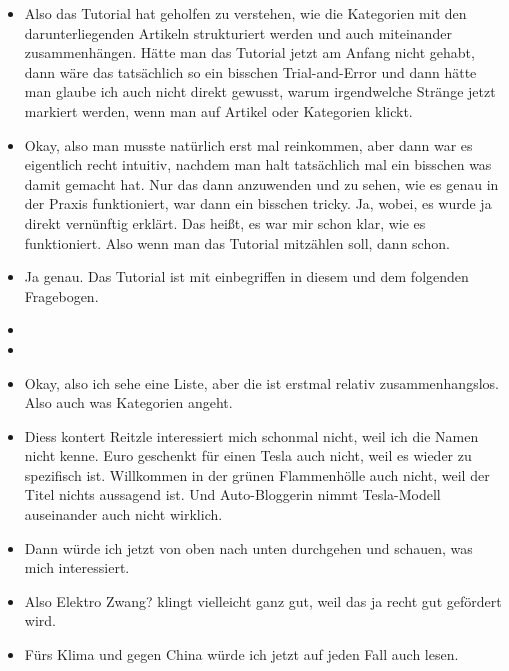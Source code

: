 {\begin{itemize}[]
            \item {} Also das Tutorial hat geholfen zu verstehen, wie die Kategorien mit den darunterliegenden Artikeln strukturiert werden und auch miteinander zusammenhängen.
                  Hätte man das Tutorial jetzt am Anfang nicht gehabt, dann wäre das tatsächlich so ein bisschen Trial-and-Error und dann hätte man glaube ich auch nicht direkt gewusst, warum irgendwelche Stränge jetzt markiert werden, wenn man auf Artikel oder Kategorien klickt.
            \item {} Okay, also man musste natürlich erst mal reinkommen, aber dann war es eigentlich recht intuitiv, nachdem man halt tatsächlich mal ein bisschen was damit gemacht hat.
                  Nur das dann anzuwenden und zu sehen, wie es genau in der Praxis funktioniert, war dann ein bisschen tricky.
                  Ja, wobei, es wurde ja direkt vernünftig erklärt.
                  Das heißt, es war mir schon klar, wie es funktioniert.
                  Also wenn man das Tutorial mitzählen soll, dann schon.
            \item {} Ja genau. Das Tutorial ist mit einbegriffen in diesem und dem folgenden Fragebogen.
            \item {}
            \item {}
            \item {} Okay, also ich sehe eine Liste, aber die ist erstmal relativ zusammenhangslos.
                  Also auch was Kategorien angeht.
            \item {} \flqq Diess kontert Reitzle\frqq{} interessiert mich schonmal nicht, weil ich die Namen nicht kenne.
                   Euro geschenkt für einen Tesla\frqq{} auch nicht, weil es wieder zu spezifisch ist.
                  \flqq Willkommen in der grünen Flammenhölle\frqq{} auch nicht, weil der Titel nichts aussagend ist.
                  Und \flqq Auto-Bloggerin nimmt Tesla-Modell auseinander\frqq{} auch nicht wirklich.
            \item {} Dann würde ich jetzt von oben nach unten durchgehen und schauen, was mich interessiert.
            \item {} Also \flqq Elektro Zwang?\frqq{} klingt vielleicht ganz gut, weil das ja recht gut gefördert wird.
            \item {} \flqq Fürs Klima und gegen China\frqq{} würde ich jetzt auf jeden Fall auch lesen.

\end{itemize}}
